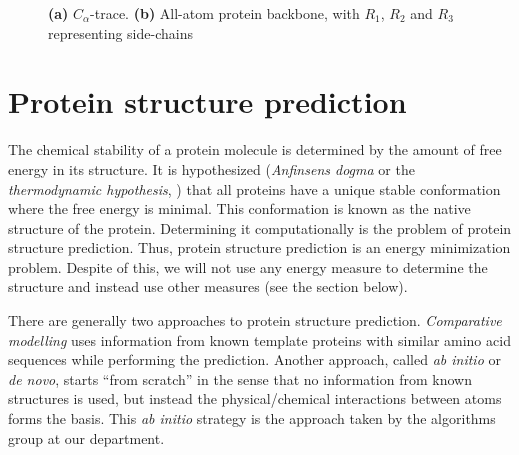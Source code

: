 

\begin{figure}
  \centering
  \caption{\textbf{(a)} $C_{\alpha}$-trace. \textbf{(b)} All-atom protein backbone, with $R_1$, $R_2$ and $R_3$ representing side-chains}
\end{figure}

\section{Protein structure prediction}
The chemical stability of a protein molecule is determined by the
amount of free energy in its structure. It is hypothesized
(\textit{Anfinsens dogma} or the \textit{thermodynamic hypothesis},
\cite{anfinsen73, soundararajan2010}) that all proteins have a unique
stable conformation where the free energy is minimal. This
conformation is known as the native structure of the
protein. Determining it computationally is the problem of protein
structure prediction. Thus, protein structure prediction is an energy
minimization problem. Despite of this, we will not use any energy
measure to determine the structure and instead use other measures (see
the section below).


There are generally two approaches to protein structure prediction.
\textit{Comparative modelling} uses information from known template
proteins with similar amino acid sequences while performing the
prediction. Another approach, called \textit{ab initio} or
\textit{de novo}, starts ``from scratch'' in the sense that no
information from known structures is used, but instead the
physical/chemical interactions between atoms forms the basis. This
\textit{ab initio} strategy is the approach taken by the algorithms
group at our department.

